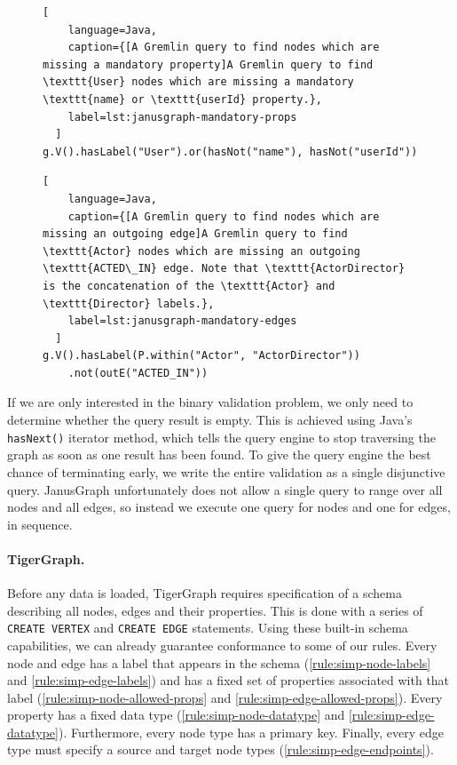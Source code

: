 \documentclass{report}
\theoremstyle{definition}
\begin{document}
\begin{figure}[H]
  \begin{lstlisting}[
    language=Java,
    caption={[A Gremlin query to find nodes which are missing a mandatory property]A Gremlin query to find \texttt{User} nodes which are missing a mandatory \texttt{name} or \texttt{userId} property.},
    label=lst:janusgraph-mandatory-props
  ]
g.V().hasLabel("User").or(hasNot("name"), hasNot("userId"))
  \end{lstlisting}
\end{figure}
\vspace*{-8pt}
\begin{figure}[H]
  \begin{lstlisting}[
    language=Java,
    caption={[A Gremlin query to find nodes which are missing an outgoing edge]A Gremlin query to find \texttt{Actor} nodes which are missing an outgoing \texttt{ACTED\_IN} edge. Note that \texttt{ActorDirector} is the concatenation of the \texttt{Actor} and \texttt{Director} labels.},
    label=lst:janusgraph-mandatory-edges
  ]
g.V().hasLabel(P.within("Actor", "ActorDirector"))
    .not(outE("ACTED_IN"))
  \end{lstlisting}
\end{figure}

If we are only interested in the binary validation problem, we only need to determine whether the query result is empty. This is achieved using Java's \texttt{hasNext()} iterator method, which tells the query engine to stop traversing the graph as soon as one result has been found. To give the query engine the best chance of terminating early, we write the entire validation as a single disjunctive query. JanusGraph unfortunately does not allow a single query to range over all nodes and all edges, so instead we execute one query for nodes and one for edges, in sequence.

\paragraph{TigerGraph.} Before any data is loaded, TigerGraph requires specification of a schema describing all nodes, edges and their properties. This is done with a series of \texttt{CREATE VERTEX} and \texttt{CREATE EDGE} statements. Using these built-in schema capabilities, we can already guarantee conformance to some of our rules. Every node and edge has a label that appears in the schema (\autoref{rule:simp-node-labels} and \ref{rule:simp-edge-labels}) and has a fixed set of properties associated with that label (\autoref{rule:simp-node-allowed-props} and \ref{rule:simp-edge-allowed-props}). Every property has a fixed data type (\autoref{rule:simp-node-datatype} and \ref{rule:simp-edge-datatype}). Furthermore, every node type has a primary key. Finally, every edge type must specify a source and target node types (\autoref{rule:simp-edge-endpoints}).
\end{document}
